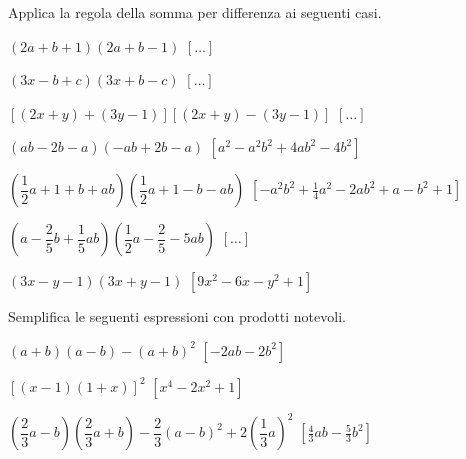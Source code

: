 \begin{esercizio}[\Ast]
 \label{ese:11.21}
Applica la regola della somma per differenza ai seguenti casi.

\begin{enumeratea}
\item $(2a+b+1)(2a+b-1)$
  \hfill $\left[ \dots \right]$
\item $(3x-b+c)(3x+b-c)$
  \hfill $\left[ \dots \right]$
\item $\left[(2x+y)+(3y-1)\right]\left[(2x+y)-(3y-1)\right]$
  \hfill $\left[ \dots \right]$
\item $(ab-2b-a)(-{ab}+2b-a)$
  \hfill $\left[a^{2}-a^{2}b^{2}+4{ab}^{2}-4b^{2}\right]$
\item $\left(\dfrac{1}{2}a+1+b+ab\right)\left(\dfrac{1}{2}a+1-b-ab\right)$
  \hfill $\left[-a^{2}b^{2}+\frac{1}{4}a^{2}-2{ab}^{2}+a-b^{2}+1\right]$
\item $\left(a-\dfrac{2}{5}b+\dfrac{1}{5}{ab}\right)
       \left(\dfrac{1}{2}a-\dfrac{2}{5}-5{ab}\right)$
  \hfill $\left[ \dots \right]$
\item $(3x-y-1)(3x+y-1)$
  \hfill $\left[9x^{2}-6x-y^{2}+1\right]$
\end{enumeratea}
\end{esercizio}

\begin{esercizio}[\Ast]
 \label{ese:11.22}
Semplifica le seguenti espressioni con prodotti notevoli.

 \begin{enumeratea}
 \item $(a+b)(a-b)-(a+b)^{2}$
  \hfill $\left[-2{ab}-2b^{2}\right]$
 \item $[(x-1)(1+x)]^{2}$
  \hfill $\left[x^{4}-2x^{2}+1\right]$
 \item 
$\left(\dfrac{2}{3}a-b\right)\left(\dfrac{2}{3}a+b\right)-\dfrac{2}{3}(a-b)^{2}
+2\left(\dfrac{1}{3}a\right)^{2}$
  \hfill $\left[\frac{4}{3}{ab}-\frac{5}{3}b^{2}\right]$
%  
% 
%  
% 
 \end{enumeratea}
\end{esercizio}

